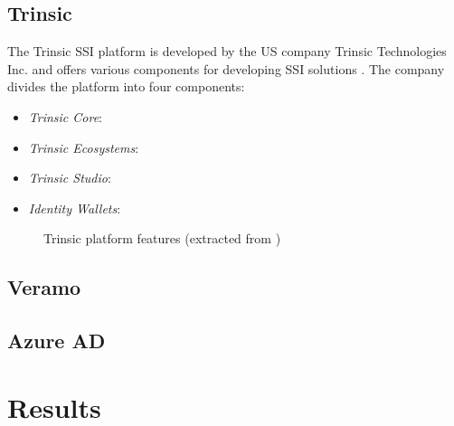     \subsection{Trinsic}\label{subsection: trinsic}
    The Trinsic SSI platform is developed by the US company Trinsic Technologies Inc. and offers various components for developing SSI solutions \cite{trinsic_trinsic_2021}. The company divides the platform into four components:
    
    \begin{itemize}
        \item \textit{Trinsic Core}: \cite{trinsic_trinsic_2021-1}
        \item \textit{Trinsic Ecosystems}: \cite{trinsic_trinsic_2021-2}
        \item \textit{Trinsic Studio}: \cite{trinsic_trinsic_2021-3}
        \item \textit{Identity Wallets}: \cite{trinsic_identity_2021}
    \end{itemize}
    
    \begin{figure}[ht]
        \centering
        \caption{Trinsic platform features (extracted from \cite{riley_hughes_announcing_2021})}
        \label{figure: trinsic features}
    \end{figure}
    
    \subsection{Veramo}\label{subsection: veramo}
    \subsection{Azure AD}\label{subsection: azure}
    \section{Results}\label{section: ri-results}